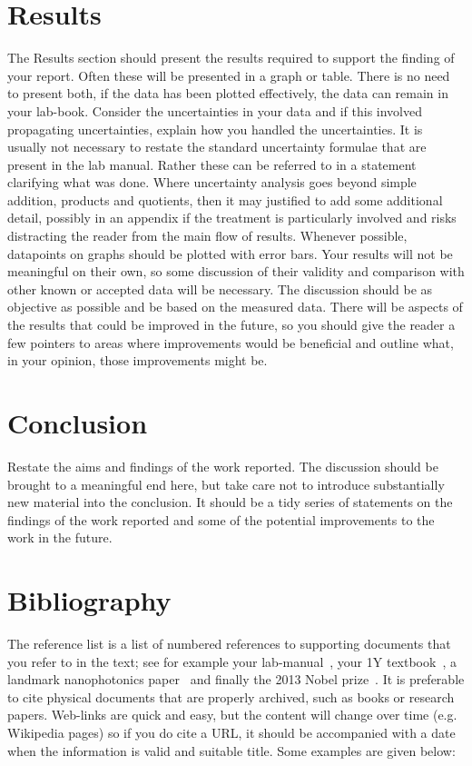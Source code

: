 \documentclass{article}
\begin{document}
\section{Results}
The Results section should present the results required to support the finding of your report.  Often these will be presented in a graph or table.  There is no need to present both, if the data has been plotted effectively, the data can remain in your lab-book.   
Consider the uncertainties in your data and if this involved propagating uncertainties, explain how you handled the uncertainties.  It is usually not necessary to restate the standard uncertainty formulae that are present in the lab manual.  Rather these can be referred to in a statement clarifying what was done.   Where uncertainty analysis goes beyond simple addition, products and quotients, then it may justified to add some additional detail, possibly in an appendix if the treatment is particularly involved and risks distracting the reader from the main flow of results.  Whenever possible, datapoints on graphs should be plotted with error bars.
Your results will not be meaningful on their own, so some discussion of their validity and comparison with other known or accepted data will be necessary.  The discussion should be as objective as possible and be based on the measured data.  There will be aspects of the results that could be improved in the future, so you should give the reader a few pointers to areas where improvements would be beneficial and outline what, in your opinion, those improvements might be.

\section{Conclusion}
Restate the aims and findings of the work reported.  The discussion should be brought to a meaningful end here, but take care not to introduce substantially new material into the conclusion.  It should be a tidy series of statements on the findings of the work reported and some of the potential improvements to the work in the future. 

\section{Bibliography}
The reference list is a list of numbered references to supporting documents that you refer to in the text; see for example your lab-manual~\cite{lab_manual}, your 1Y textbook~\cite{young_freedman}, a landmark nanophotonics paper~\cite{ebbesen:98} and finally the 2013 Nobel prize~\cite{nobel_prize}.  It is preferable to cite physical documents that are properly archived, such as books or research papers.  Web-links are quick and easy, but the content will change over time (e.g. Wikipedia pages) so if you do cite a URL, it should be accompanied with a date when the information is valid and suitable title. Some examples are given below:
\end{document}
